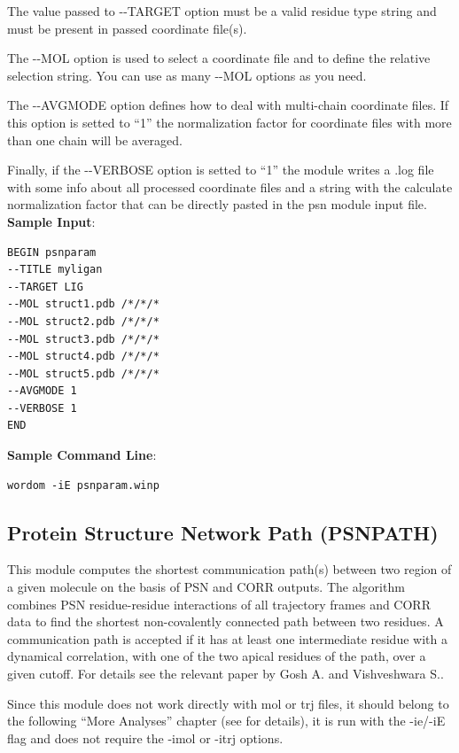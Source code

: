 \documentclass[11pt,twoside,onecolumn,a4paper,openright,notitlepage]{book}[2001/04/21]
\begin{document}
The value passed to -{}-TARGET option must be a valid residue type string and must be present in passed coordinate file(s).

The -{}-MOL option is used to select a coordinate file and to define the relative selection string. You can use as many -{}-MOL options as you need.

The -{}-AVGMODE option defines how to deal with multi-chain coordinate files. If this option is setted to ``1'' the normalization
factor for coordinate files with more than one chain will be averaged.

Finally, if the -{}-VERBOSE option is setted to ``1'' the module writes a .log file with some info about all processed coordinate files
and a string with the calculate normalization factor that can be directly pasted in the psn module input file.\\

\textbf{\large Sample Input}:
\begin{verbatim}
BEGIN psnparam
--TITLE myligan
--TARGET LIG
--MOL struct1.pdb /*/*/*
--MOL struct2.pdb /*/*/*
--MOL struct3.pdb /*/*/*
--MOL struct4.pdb /*/*/*
--MOL struct5.pdb /*/*/*
--AVGMODE 1
--VERBOSE 1
END
\end{verbatim}

\textbf{\large Sample Command Line}:
\begin{verbatim}
wordom -iE psnparam.winp
\end{verbatim}

\subsection{Protein Structure Network Path (PSNPATH)}
This module computes the shortest communication path(s) between two region of a given molecule on the basis of PSN and CORR outputs. The algorithm combines PSN residue-residue interactions of all trajectory frames and CORR data to find the shortest non-covalently connected path between two residues. A communication path is accepted if it has at least one intermediate residue with a dynamical correlation, with one of the two apical residues of the path, over a given cutoff. For details see the relevant paper by Gosh A. and Vishveshwara S.\cite{ghosh2007study}.

Since this module does not work directly with mol or trj files, it should belong to the following ``More Analyses'' chapter (see for details), it is run with the -ie/-iE flag and does not require the -imol or -itrj options.\\
\end{document}

